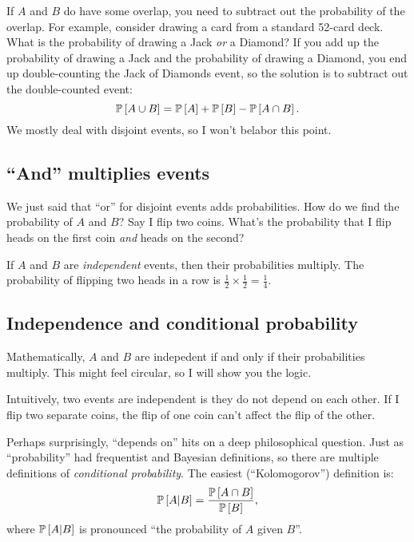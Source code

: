 If $A$ and $B$ do have some overlap, you need to subtract out the probability
of the overlap. For example, consider drawing a card
from a standard 52-card deck. What is the probability of drawing a Jack \emph{or} a
Diamond? If you add up the probability of drawing a Jack and the probability
of drawing a Diamond, you end up double-counting the Jack of Diamonds event,
so the solution is to subtract out the double-counted event:
$$
\mathbb{P}\left[{A \cup B}\right] = \mathbb{P}\left[{A}\right] + \mathbb{P}\left[{B}\right] - \mathbb{P}\left[{A \cap B}\right].
$$
We mostly deal with disjoint events, so I won't belabor this point.

\subsection{``And'' multiplies events}

We just said that ``or'' for disjoint events adds probabilities. How do we
find the probability of $A$ and $B$? Say I flip two coins. What's the
probability that I flip heads on the first coin \emph{and} heads on the second?

If $A$ and $B$ are \emph{independent} events, then their probabilities
multiply. The probability of flipping two heads in a row is $\tfrac{1}{2} \times
\tfrac{1}{2} = \tfrac{1}{4}$.

\subsection{Independence and conditional probability}

Mathematically, $A$ and $B$ are indepedent if and only if their probabilities
multiply. This might feel circular, so I will show you the logic.

Intuitively, two events are independent is they do not depend on each other. If
I flip two separate coins, the flip of one coin can't affect the flip of the
other.

Perhaps surprisingly, ``depends on'' hits on a deep philosophical question.
Just as ``probability'' had frequentist and Bayesian definitions, so there are
multiple definitions of \emph{conditional probability}. The easiest
(``Kolomogorov'') definition is:
\begin{equation*}
\mathbb{P}\left[{A | B}\right] = \frac{\mathbb{P}\left[{A \cap B}\right]}{\mathbb{P}\left[{B}\right]},
\end{equation*}
where $\mathbb{P}\left[{A | B}\right]$ is pronounced ``the probability of $A$ given $B$''.

